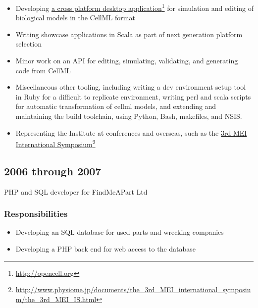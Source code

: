 \documentclass[10pt,oneside]{memoir}
\begin{document}
\begin{itemize}


\item Developing \href{http://opencell.org}{a cross platform desktop application}\footnote{\href{http://opencell.org}{http://opencell.org}} for simulation and editing of biological models in the CellML format

\item Writing showcase applications in Scala as part of next generation platform selection

\item Minor work on an API for editing, simulating, validating, and generating code from CellML

\item Miscellaneous other tooling, including writing a dev environment setup tool in Ruby for a difficult to replicate environment, writing perl and scala scripts for automatic transformation of cellml models, and extending and maintaining the build toolchain, using Python, Bash, makefiles, and NSIS.

\item Representing the Institute at conferences and overseas, such as the \href{http://www.physiome.jp/documents/the_3rd_MEI_international_symposium/the_3rd_MEI_IS.html}{3rd MEI International Symposium}\footnote{\href{http://www.physiome.jp/documents/the_3rd_MEI_international_symposium/the_3rd_MEI_IS.html}{http://www.physiome.jp/documents/the\_3rd\_MEI\_international\_symposium/the\_3rd\_MEI\_IS.html}}
\end{itemize}

\subsection*{2006 through 2007}
\label{through2007}

PHP and SQL developer for FindMeAPart Ltd


\subsubsection*{Responsibilities}
\label{responsibilities}

\begin{itemize}


\item Developing an SQL database for used parts and wrecking companies

\item Developing a PHP back end for web access to the database
\end{itemize}
\end{document}
